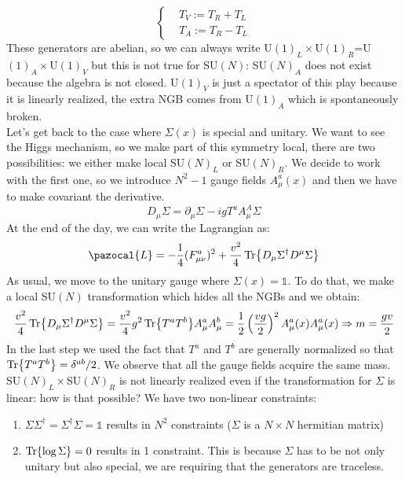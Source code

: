 \documentclass[../main.tex]{subfiles}
\begin{document}
\[
\left\{
\begin{aligned}
&T_V:=T_R+T_L\\    
&T_A:=T_R-T_L
\end{aligned}
\right.
\]
These generators are abelian, so we can always write U$(1)_L\times$U$(1)_R$=U$(1)_A\times$U$(1)_V$ but this is not true for SU$(N)$: SU$(N)_A$ does not exist because the algebra is not closed. U$(1)_V$ is just a spectator of this play because it is linearly realized, the extra NGB comes from U$(1)_A$ which is spontaneously broken.\\
Let's get back to the case where $\Sigma(x)$ is special and unitary. We want to see the Higgs mechanism, so we make part of this symmetry local, there are two possibilities: we either make local SU$(N)_L$ or SU$(N)_R$. We decide to work with the first one, so we introduce $N^2-1$ gauge fields $A_\mu^a(x)$ and then we have to make covariant the derivative.
\[
D_\mu\Sigma=\partial_\mu\Sigma-igT^aA_\mu^A\Sigma
\]
At the end of the day, we can write the Lagrangian as:
\[
\pazocal{L}=-\frac{1}{4}(F_{\mu\nu}^a)^2+\frac{v^2}{4}\Tr{D_\mu\Sigma^\dagger D^\mu\Sigma}
\]
As usual, we move to the unitary gauge where $\Sigma(x)=\mathbb{1}$. To do that, we make a local SU$(N)$ transformation which hides all the NGBs and we obtain:
\[
\frac{v^2}{4}\Tr{D_\mu\Sigma^\dagger D^\mu\Sigma}=\frac{v^2}{4}g^2\Tr{T^aT^b}A_\mu^aA_\mu^b=\frac{1}{2}\left(\frac{vg}{2}\right)^2A_\mu^a(x)A_\mu^a(x)\Rightarrow m=\frac{gv}{2}
\]
In the last step we used the fact that $T^a$ and $T^b$ are generally normalized so that $\Tr{T^aT^b}=\delta^{ab}/2$. We observe that all the gauge fields acquire the same mass.
SU$(N)_L\times$SU$(N)_R$ is not linearly realized even if the transformation for $\Sigma$ is linear: how is that possible? We have two non-linear constraints:
\begin{enumerate}
    \item $\Sigma\Sigma^\dagger=\Sigma^\dagger\Sigma=\mathbb{1}$ results in $N^2$ constraints ($\Sigma$ is a $N\times N$ hermitian matrix)
    \item $\Tr{\log\Sigma}=0$ results in 1 constraint. This is because $\Sigma$ has to be not only unitary but also special, we are requiring that the generators are traceless.
\end{enumerate}
\end{document}
